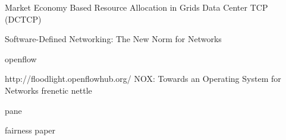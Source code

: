 \documentclass[a4paper,11pt,twocolumn]{article}
\begin{document}
\begin{thebibliography}{99}
Market Economy Based 
Resource Allocation in Grids
Data Center TCP (DCTCP)

Software-Defined Networking:
The New Norm for Networks

openflow

http://floodlight.openflowhub.org/
NOX: Towards an Operating System for Networks
frenetic
 nettle

pane

fairness paper

\end{thebibliography}


 
\end{document}
